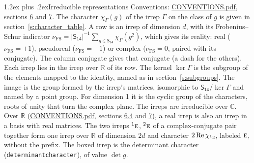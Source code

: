 \documentclass[10pt,a4paper]{article}
\makeatletter
\renewcommand\section{\@startsection{section}{1}{\z@}{-3ex plus -1ex minus -.2ex}%
  {1.2ex plus .2ex}{\normalfont\large\sffamily\bfseries\color{parttitle}}}
\numberwithin{equation}{section}
\newcommand{\grp}[1]{\mathsf{#1}}
\newcommand{\irr}[1]{\text{\normalfont\scshape #1}}
\newcommand{\conjpair}[1]{{}^{#1}}
\newcommand{\irchar}[1]{\chi_{#1}}
\newcommand{\fsind}{\nu_{\mathrm{FS}}}
\makeatother
\begin{document}
\section{Irreducible representations}\label{s:irreps}
Conventions: \href{../../CONVENTIONS.pdf}{CONVENTIONS.pdf}, sections \href{../../CONVENTIONS.pdf\#conv.6}{6} and \href{../../CONVENTIONS.pdf\#conv.7}{7}.
\leavevmode\label{n:function.character}\label{n:irrep.Gamma}The character $\irchar{\Gamma}(g)$ of the irrep $\Gamma$ on the class of $g$ is given in section~\ref{s:character_table}.
\leavevmode\label{n:index.dimension}\label{n:index.frobenius}\label{n:head.irrep}\label{n:head.reality}A row is an irrep of dimension $d$, with its Frobenius--Schur indicator $\fsind = |\grp{S_{14}}|^{-1}\allowbreak\sum_{g\in\grp{S_{14}}}\irchar{\Gamma}(g^2)$, which gives its reality: real ($\fsind = +1$), pseudoreal ($\fsind = -1$) or complex ($\fsind = 0$, paired with its conjugate). \label{n:head.conjugate}The column conjugate gives that conjugate (a dash for the others). \label{n:head.over.real}Each irrep lies in the irrep over $\mathbb{R}$ of its row. \label{n:head.kernel}The kernel $\ker\Gamma$ is the subgroup of the elements mapped to the identity, named as in section~\ref{s:subgroups}. \label{n:head.image}The image is the group formed by the irrep's matrices, isomorphic to $\grp{S_{14}}/\ker\Gamma$ and named by a point group. For dimension 1 it is the cyclic group of the characters, roots of unity that turn the complex plane. The irreps are irreducible over $\mathbb{C}$. Over $\mathbb{R}$ (\href{../../CONVENTIONS.pdf}{CONVENTIONS.pdf}, sections \href{../../CONVENTIONS.pdf\#conv.6.4}{6.4} and \href{../../CONVENTIONS.pdf\#conv.7}{7}), a real irrep is also an irrep in a basis with real matrices. The two irreps $\conjpair{1}\irr{e}$, $\conjpair{2}\irr{e}$ of a complex-conjugate pair together form one irrep over $\mathbb{R}$ of dimension $2d$ and character $2\operatorname{Re}\irchar{\conjpair{1}\irr{e}}$, labeled $\irr{e}$, without the prefix. \label{n:mark.determinant}The boxed irrep is the determinant character (\texttt{determinantcharacter}), of value $\det g$.
\setlength{\emergencystretch}{2em}\par\setlength{\emergencystretch}{0pt}
\end{document}
